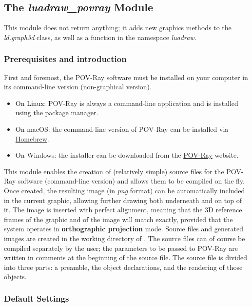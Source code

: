 \subsection{The \emph{luadraw\_povray} Module}

\newcommand*{\povray}{POV-Ray\xspace}%

This module does not return anything; it adds new graphics methods to the \emph{ld.graph3d} class, as well as a function in the namespace \emph{luadraw}.

\subsubsection{Prerequisites and introduction}

First and foremost, the \povray software must be installed on your computer in its command-line version (non-graphical version).
\begin{itemize}
\item On Linux: \povray is always a command-line application and is installed using the package manager.
\item On macOS: the command-line version of \povray can be installed via \href{https://formulae.brew.sh/formula/povray\#default)}{Homebrew}.
\item On Windows: the installer can be downloaded from the \href{https://www.povray.org/download/}{\povray} website.
\end{itemize}

This module enables the creation of (relatively simple) source files for the \povray software (command-line version) and allows them to be compiled on the fly. Once created, the resulting image (in \emph{png} format) can be automatically included in the current graphic, allowing further drawing both underneath and on top of it.
The image is inserted with perfect alignment, meaning that the 3D reference frames of the graphic and of the image will match exactly, provided that the system operates in \textbf{orthographic projection} mode.
Source files and generated images are created in the working directory of \luadrawenv. The source files can of course be compiled separately by the user; the parameters to be passed to \povray are written in comments at the beginning of the source file.
The source file is divided into three parts: a preamble, the object declarations, and the rendering of those objects.

\subsubsection{Default Settings}

